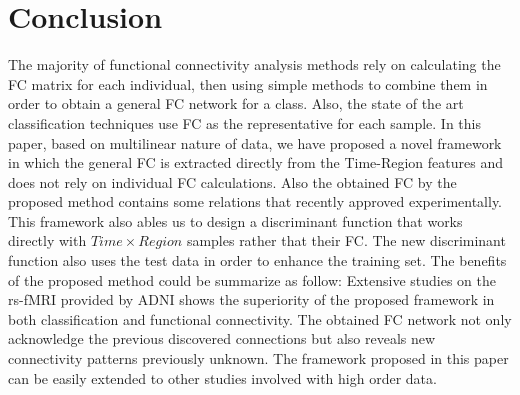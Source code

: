 \documentclass[preprint,12pt]{elsarticle}
\begin{document}
	
	
	
	
	
	
	
	
	
	\section{Conclusion}
	The majority of functional connectivity analysis methods rely on calculating the FC matrix for each individual, then using simple methods to combine them in order to obtain a general FC network for a class. Also, the state of the art classification techniques  use FC as the representative for each sample. In this paper, based on multilinear nature of data, we have proposed a novel framework in which the general FC is extracted directly from the Time-Region features  and does not rely on individual FC calculations. Also the obtained FC by the proposed method contains some relations that recently  approved 
	experimentally.
	This framework also ables us to design a discriminant function that works directly with $Time \times  Region$ samples rather that their FC. The new discriminant function also uses the test data in order to enhance the training set. The benefits of the proposed method could be summarize as follow: 
	Extensive studies on the rs-fMRI provided by ADNI shows the superiority of the proposed framework in both classification and functional connectivity. The obtained FC network not only acknowledge the previous discovered connections but also reveals new connectivity patterns previously unknown.
	The framework proposed in this paper can be easily extended to other studies involved with high order data.  
	
\end{document}
